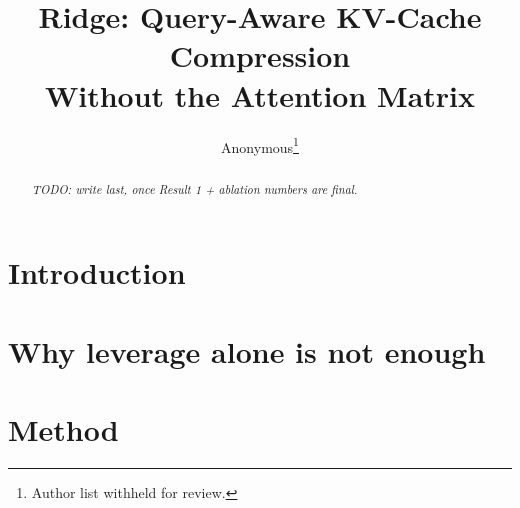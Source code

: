 \documentclass{article}
\title{Ridge: Query-Aware KV-Cache Compression\\ Without the Attention Matrix}
\author{Anonymous\thanks{Author list withheld for review.}}
\begin{document}
\maketitle

\begin{abstract}
\textit{TODO: write last, once Result 1 + ablation numbers are final.}
\end{abstract}

\section{Introduction}
\label{sec:intro}

\section{Why leverage alone is not enough}
\label{sec:motivation}

\section{Method}
\label{sec:method}
\end{document}
